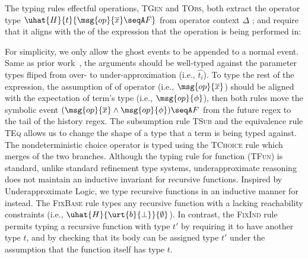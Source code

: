The typing rules effectful operations, \textsc{TGen} and
\textsc{TObs}, both extract the operator type
$\uhat{H}{t}{\msg{op}{\overline{x}}\seqA F}$ from operator context
$\Delta$ ;
and require that it aligns with the \tyName{} of the expression that
the operation is being performed in:%
\vspace{-.4cm} \par{}%
\noindent For simplicity, we only allow the ghost events to be
appended to a normal event.  Same as prior work~\cite{CoverageType},
the arguments should be well-typed against the parameter types fliped
from over- to under-approximation (i.e., $\widehat{t_i}$).  To type
the rest of the expression, the assumption of \tyName of operator
(i.e., $\msg{op}{\overline{x}}$) should be aligned with the
expectation of term's type (i.e., $\msg{op}{\phi}$), then both rules
move the symbolic event
$(\msg{op}{\overline{x}} \land \msg{op}{\phi})\seqA F$ from the future
regex to the tail of the history regex. The subsumption rule
\textsc{TSub} and the equivalence rule \textsc{TEq} allows us to
change the shape of a type that a term is being typed against.  The
nondeterministic choice operator is typed using the \textsc{TChoice}
rule which merges \tyName{} of the two branches.  Although the typing
rule for function (\textsc{TFun}) is standard, unlike standard
refinement type systems, underapproximate reasoning does not maintain
an inductive invariant for recursive functions. Inspired by
Underapproximate Logic, we type recursive functions in an inductive
manner for instead. The \textsc{FixBase} rule types any recursive
function with a \tyName{} lacking reachability constraints (i.e.,
$\uhat{H}{\urt{b}{\bot}}{\emptyset}$). In contrast, the
\textsc{FixInd} rule permits typing a recursive function with type
$t'$ by requiring it to have another type $t$, and by checking that
its body can be assigned type $t'$ under the assumption that the
function itself has type $t$.  

